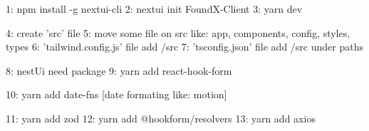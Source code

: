 1: npm install -g nextui-cli
2: nextui init FoundX-Client
3: yarn dev


4: create 'src' file
5: move some file on src like: app, components, config, styles, types
6: 'tailwind.config.js' file add /src
7: 'tsconfig.json' file add /src under paths

8: nestUi need package
9: yarn add react-hook-form

10: yarn add date-fns [date formating like: motion]

11: yarn add zod
12: yarn add @hookform/resolvers
13: yarn add axios